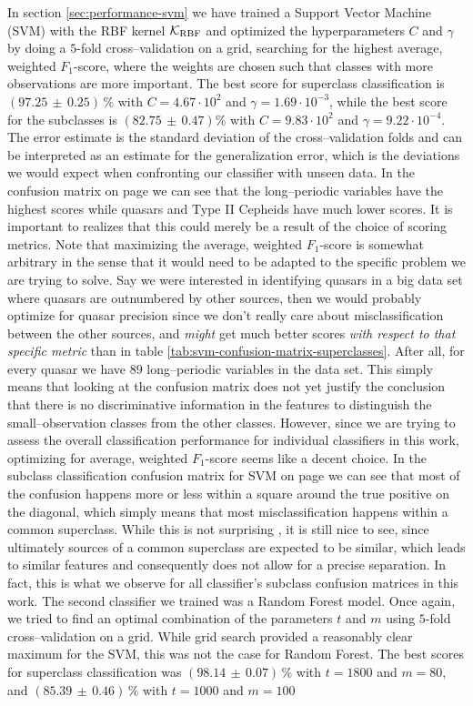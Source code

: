 In section \ref{sec:performance-svm} we have trained a Support Vector Machine (SVM) with the RBF kernel $\mathcal{K}_\text{RBF}$ and optimized the hyperparameters $C$ and $\gamma$ by doing a $5$-fold cross--validation on a grid, searching for the highest average, weighted $F_1$-score, where the weights are chosen such that classes with more observations are more important. The best score for superclass classification is $(97.25 \, \pm \, 0.25) \, \%$ with $C = 4.67 \cdot 10^2$ and $\gamma = 1.69 \cdot 10^{-3}$, while the best score for the subclasses is $(82.75 \, \pm \, 0.47) \%$ with $C = 9.83 \cdot 10^2$ and $\gamma = 9.22 \cdot 10^{-4}$. The error estimate is the standard deviation of the cross--validation folds and can be interpreted as an estimate for the generalization error, which is the deviations we would expect when confronting our classifier with unseen data. In the confusion matrix on page \pageref{tab:svm-confusion-matrix-superclasses} we can see that the long--periodic variables have the highest scores while quasars and Type II Cepheids have much lower scores. It is important to realizes that this could merely be a result of the choice of scoring metrics. Note that maximizing the average, weighted $F_1$-score is somewhat arbitrary in the sense that it would need to be adapted to the specific problem we are trying to solve. Say we were interested in identifying quasars in a big data set where quasars are outnumbered by other sources, then we would probably optimize for quasar precision since we don't really care about misclassification between the other sources, and \emph{might} get much better scores \emph{with respect to that specific metric} than in table \ref{tab:svm-confusion-matrix-superclasses}. After all, for every quasar we have 89 long--periodic variables in the data set. This simply means that looking at the confusion matrix does not yet justify the conclusion that there is no discriminative information in the features to distinguish the small--observation classes from the other classes. However, since we are trying to assess the overall classification performance for individual classifiers in this work, optimizing for average, weighted $F_1$-score seems like a decent choice. In the subclass classification confusion matrix for SVM on page \pageref{tab:svm-confusion-matrix-subclasses} we can see that most of the confusion happens more or less within a square around the true positive on the diagonal, which simply means that most misclassification happens within a common superclass. While this is not surprising , it is still nice to see, since ultimately sources of a common superclass are expected to be similar, which leads to similar features and consequently does not allow for a precise separation. In fact, this is what we observe for all classifier's subclass confusion matrices in this work. The second classifier we trained was a Random Forest model. Once again, we tried to find an optimal combination of the parameters $t$ and $m$ using $5$-fold cross--validation on a grid. While grid search provided a reasonably clear maximum for the SVM, this was not the case for Random Forest. The best scores for superclass classification was $(98.14 \, \pm \, 0.07) \, \%$ with $t = 1800$ and $m = 80$, and $(85.39 \, \pm \, 0.46) \, \%$ with $t = 1000$ and $m = 100$ 